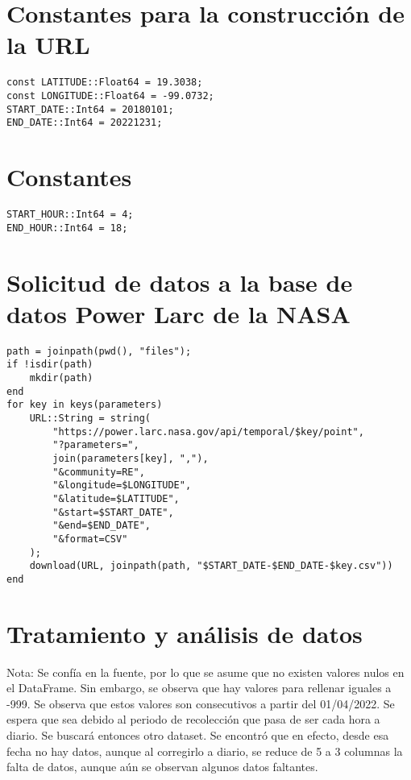 \section*{Constantes para la construcción de la URL}

\begin{lstlisting}
const LATITUDE::Float64 = 19.3038;
const LONGITUDE::Float64 = -99.0732;
START_DATE::Int64 = 20180101;
END_DATE::Int64 = 20221231;
\end{lstlisting}

\section*{Constantes}

\begin{lstlisting}
START_HOUR::Int64 = 4;
END_HOUR::Int64 = 18;
\end{lstlisting}

\section*{Solicitud de datos a la base de datos Power Larc de la NASA}

\begin{lstlisting}
path = joinpath(pwd(), "files");
if !isdir(path)
	mkdir(path)
end
for key in keys(parameters)
	URL::String = string(
		"https://power.larc.nasa.gov/api/temporal/$key/point",
		"?parameters=",
		join(parameters[key], ","),
		"&community=RE",
		"&longitude=$LONGITUDE",
		"&latitude=$LATITUDE",
		"&start=$START_DATE",
		"&end=$END_DATE",
		"&format=CSV"
	);
	download(URL, joinpath(path, "$START_DATE-$END_DATE-$key.csv"))
end
\end{lstlisting}

\section*{Tratamiento y análisis de datos}

Nota: Se confía en la fuente, por lo que se asume que no existen valores nulos en el DataFrame. Sin embargo, se observa que hay valores para rellenar iguales a -999. Se observa que estos valores son consecutivos a partir del 01/04/2022. Se espera que sea debido al periodo de recolección que pasa de ser cada hora a diario. Se buscará entonces otro dataset. Se encontró que en efecto, desde esa fecha no hay datos, aunque al corregirlo a diario, se reduce de 5 a 3 columnas la falta de datos, aunque aún se observan algunos datos faltantes.

